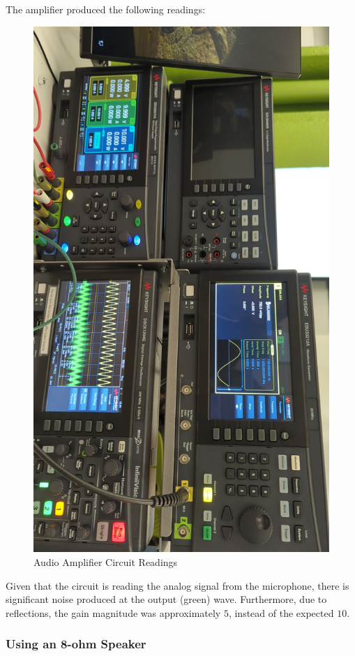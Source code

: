 \documentclass[
	letterpaper, %
	10pt, %
]{CSUniSchoolLabReport}
\begin{document}
The amplifier produced the following readings:

\begin{figure}[H]
  \centering
  \includegraphics[width=.9\textwidth]{Figures/L1F4.jpg}
  \caption{Audio Amplifier Circuit Readings}
  \label{fig:16}
\end{figure}

Given that the circuit is reading the analog signal from the microphone, there is significant noise produced at the output (green) wave. Furthermore, due to reflections, the gain magnitude was approximately $5$, instead of the expected $10$.

\subsubsection{Using an 8-ohm Speaker}
\end{document}
